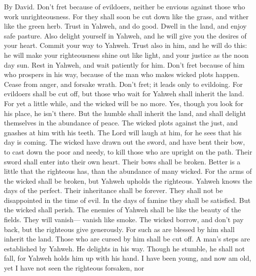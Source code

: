By David.  Don't fret because of evildoers, neither be
envious against those who work unrighteousness.  For they
shall soon be cut down like the grass, and wither like the green herb.
 Trust in Yahweh, and do good. Dwell in the land, and
enjoy safe pasture.  Also delight yourself in Yahweh, and
he will give you the desires of your heart.  Commit your
way to Yahweh. Trust also in him, and he will do this:  he
will make your righteousness shine out like light, and your justice as
the noon day sun.  Rest in Yahweh, and wait patiently for
him. Don't fret because of him who prospers in his way, because of the
man who makes wicked plots happen.  Cease from anger, and
forsake wrath. Don't fret; it leads only to evildoing. 
For evildoers shall be cut off, but those who wait for Yahweh shall
inherit the land.  For yet a little while, and the wicked
will be no more. Yes, though you look for his place, he isn't there.
 But the humble shall inherit the land, and shall delight
themselves in the abundance of peace.  The wicked plots
against the just, and gnashes at him with his teeth.  The
Lord will laugh at him, for he sees that his day is coming.
 The wicked have drawn out the sword, and have bent their
bow, to cast down the poor and needy, to kill those who are upright on
the path.  Their sword shall enter into their own heart.
Their bows shall be broken.  Better is a little that the
righteous has, than the abundance of many wicked.  For
the arms of the wicked shall be broken, but Yahweh upholds the
righteous.  Yahweh knows the days of the perfect. Their
inheritance shall be forever.  They shall not be
disappointed in the time of evil. In the days of famine they shall be
satisfied.  But the wicked shall perish. The enemies of
Yahweh shall be like the beauty of the fields. They will vanish---
vanish like smoke.  The wicked borrow, and don't pay
back, but the righteous give generously.  For such as are
blessed by him shall inherit the land. Those who are cursed by him shall
be cut off.  A man's steps are established by Yahweh. He
delights in his way.  Though he stumble, he shall not
fall, for Yahweh holds him up with his hand.  I have been
young, and now am old, yet I have not seen the righteous forsaken, nor
